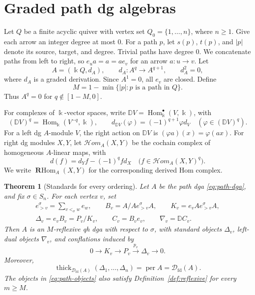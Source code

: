 \documentclass[11pt,a4paper]{article}
\newcommand{\D}{\mathcal D}
\newcommand{\RR}{\mathbf{R}}
\newcommand{\std}{\Delta}
\newcommand{\costd}{\nabla}
\newcommand{\dual}{\mathbb D}
\newcommand{\dgHom}{\mathcal{H}\!om}
\DeclareMathOperator{\fd}{fd}
\DeclareMathOperator{\Hom}{Hom}
\DeclareMathOperator{\RHom}{\RR Hom}
\DeclareMathOperator{\thick}{thick}
\DeclareMathOperator{\per}{per}
\theoremstyle{plain}
\newtheorem{theorem}{Theorem}[section]
\theoremstyle{definition}
\numberwithin{equation}{section}
\begin{document}
\section{Graded path dg algebras}\label{sec:paths}

Let $Q$ be a finite acyclic quiver with vertex set
$Q_0=\{1,\ldots,n\}$, where $n\geq1$.
Give each arrow an integer degree at most $0$.
For a path $p$, let $s(p)$, $t(p)$, and $|p|$ denote its source,
target, and degree. Trivial paths have degree $0$.
We concatenate paths from left to right, so
$e_ua=a=ae_v$ for an arrow $a:u\to v$.
Let
\begin{equation}\label{eq:path-dga}
 A=(\Bbbk Q,d_A),\qquad
 d_A:A^q\longrightarrow A^{q+1},\qquad d_A^2=0,
\end{equation}
where $d_A$ is a graded derivation. Since $A^1=0$, all $e_v$ are closed.
Define
\begin{equation}\label{eq:path-width}
 M=1-\min\{|p|:p\text{ is a path in }Q\}.
\end{equation}
Thus $A^q=0$ for $q\notin[1-M,0]$.

For complexes of $\Bbbk$-vector spaces, write
$\dual V=\Hom^\bullet_{\Bbbk}(V,\Bbbk)$, with
\[
 (\dual V)^q=\Hom_{\Bbbk}(V^{-q},\Bbbk),
 \qquad d_{\dual V}(\varphi)=(-1)^{q+1}\varphi d_V
 \quad(\varphi\in(\dual V)^q).
\]
For a left dg $A$-module $V$, the right action on $\dual V$ is
$(\varphi a)(x)=\varphi(ax)$.
For right dg modules $X,Y$, let $\dgHom_A(X,Y)$ be the cochain complex
of homogeneous $A$-linear maps, with
\[
 d(f)=d_Yf-(-1)^q f d_X
 \quad\bigl(f\in\dgHom_A(X,Y)^q\bigr).
\]
We write $\RHom_A(X,Y)$ for the corresponding derived Hom complex.

\begin{theorem}[Standards for every ordering]\label{thm:paths}
Let $A$ be the path dga \eqref{eq:path-dga}, and fix $\sigma\in S_n$.
For each vertex $v$, set
\begin{equation}\label{eq:path-objects}
 \begin{gathered}
 e_{>v}^{\sigma}=\sum_{v<_\sigma w}e_w,\qquad
 B_v=A/Ae_{>v}^{\sigma}A,\qquad
 K_v=e_vAe_{>v}^{\sigma}A,\\
 \std_v=e_vB_v=P_v/K_v,\qquad
 C_v=B_ve_v,\qquad
 \costd_v=\dual C_v.
 \end{gathered}
\end{equation}
Then $A$ is an $M$-reflexive qh dga with respect to $\sigma$, with
standard objects $\std_v$, left-dual objects $\costd_v$, and
conflations induced by
\begin{equation}\label{eq:path-short-exact}
 0\longrightarrow K_v\longrightarrow P_v
       \xrightarrow{p_v}\std_v\longrightarrow0.
\end{equation}
Moreover,
\begin{equation}\label{eq:path-full}
 \thick_{\D_{\fd}(A)}(\std_1,\ldots,\std_n)
       =\per A=\D_{\fd}(A).
\end{equation}
The objects in \eqref{eq:path-objects} also satisfy
Definition~\ref{def:reflexive} for every $m\geq M$.
\end{theorem}
\end{document}
